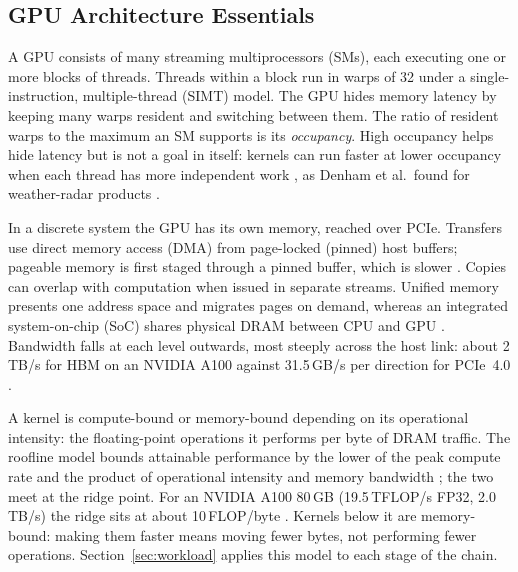 \subsection{GPU Architecture Essentials}
A GPU consists of many streaming multiprocessors (SMs), each executing one or
more blocks of threads.
Threads within a block run in warps of 32 under a single-instruction,
multiple-thread (SIMT) model.
The GPU hides memory latency by keeping many warps resident and switching between them.
The ratio of resident warps to the maximum an SM supports is its
\emph{occupancy}.
High occupancy helps hide latency but is not a goal in itself: kernels can run
faster at lower occupancy when each thread has more independent work
\cite{volkovUnderstandingLatencyHiding2016}, as Denham et al.\ found for weather-radar products
\cite{denhamWeatherRadarData2018a}.

In a discrete system the GPU has its own memory, reached over PCIe.
Transfers use direct memory access (DMA) from page-locked (pinned) host
buffers; pageable memory is first staged through a pinned buffer, which is
slower \cite{gonzalezCUDALibraryT2OURNAMINT}.
Copies can overlap with computation when issued in separate streams.
Unified memory presents one address space and migrates pages on demand,
whereas an integrated system-on-chip (SoC) shares physical DRAM between CPU and GPU \cite{yangDistributedRealTimeImage2022a}.
Bandwidth falls at each level outwards, most steeply across the host link:
about 2\,TB/s for HBM on an NVIDIA A100 against 31.5\,GB/s per direction for
PCIe~4.0 \cite{NVIDIAA100Tensor, nvidiaA100TensorCore2020}.

A kernel is compute-bound or memory-bound depending on its operational
intensity: the floating-point operations it performs per byte of DRAM traffic.
The roofline model bounds attainable performance by the lower of the peak
compute rate and the product of operational intensity and memory bandwidth
\cite{williamsRooflineInsightfulVisual2009a}; the two meet at the ridge point.
For an NVIDIA A100 80\,GB (19.5\,TFLOP/s FP32, 2.0\,TB/s) the ridge sits at
about 10\,FLOP/byte \cite{NVIDIAA100Tensor}.
Kernels below it are memory-bound: making them faster means moving fewer bytes,
not performing fewer operations.
Section~\ref{sec:workload} applies this model to each stage of the chain.
